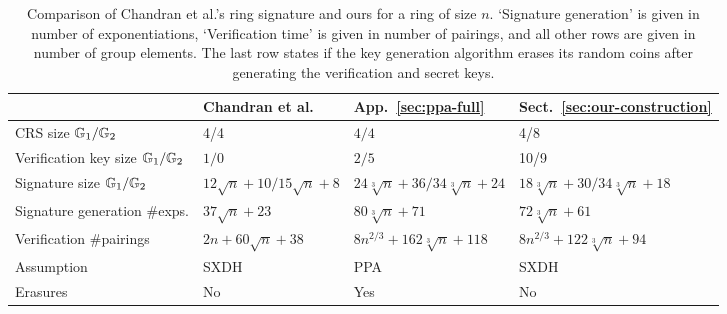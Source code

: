 
\begin{table}[h]
\begin{center}
\begin{minipage}{\textwidth}
\begin{center}
\begin{scriptsize}
\begin{tabular}{l|l|l|l}
                                           & Chandran et al.~\cite{ICALP:ChaGroSah07} & App.~\ref{sec:ppa-full} &  Sect.~\ref{sec:our-construction} \\
\hline%
\rule{0pt}{2.5ex}CRS size  $\mathbb{G}_1/\mathbb{G}_2$              & 4/4                                      & $4/4$  & 4/8    \\
\rule{0pt}{2.5ex}Verification key size $\mathbb{G}_1/\mathbb{G}_2$    & $1/0$                                       & $2/5$  &   10/9  \\
\rule{0pt}{2.5ex}Signature size      $\mathbb{G}_1/\mathbb{G}_2$      & $12\sqrt{n}+10/15\sqrt{n}+8$                        & $24\sqrt[3]{n} + 36/34\sqrt[3]{n} + 24$& $18\sqrt[3]{n} + 30/34\sqrt[3]{n} + 18$\\
\rule{0pt}{2.5ex}Signature generation \#exps. & $37\sqrt{n}+23$                        & $80\sqrt[3]{n}+71$&$72\sqrt[3]{n}+61$\\
\rule{0pt}{2.5ex}Verification \#pairings         & $2n + 60\sqrt{n}+38$                & $8n^{2/3} + 162\sqrt[3]{n} + 118$&$8n^{2/3} + 122\sqrt[3]{n} + 94$\\
\rule{0pt}{2.5ex}Assumption         & SXDH                & PPA & SXDH\\
\rule{0pt}{2.5ex}Erasures         & No                & Yes & No\\
\end{tabular}
\end{scriptsize}
\end{center}
\caption{Comparison of Chandran et al.'s ring signature and ours for a ring of size $n$. `Signature generation' is given in number of exponentiations, `Verification time' is given in number of pairings, and all other rows are given in number of group elements. The last row states if the key generation algorithm erases its random coins after generating the verification and secret keys.
\label{table:eff}}
\end{minipage}
\end{center}
\end{table}
